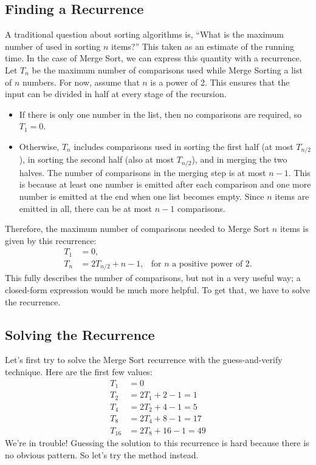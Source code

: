 \subsection{Finding a Recurrence}
A traditional question about sorting algorithms is, ``What is the
maximum number of  used in sorting $n$ items?''  This
taken as an estimate of the running time.  In the case of Merge Sort,
we can express this quantity with a recurrence.  Let $T_n$ be the
maximum number of comparisons used while Merge Sorting a list of $n$
numbers.  For now, assume that $n$ is a power of 2.  This ensures that
the input can be divided in half at every stage of the recursion.
\begin{itemize}
\item If there is only one number in the list, then no comparisons are
  required, so $T_1 = 0$.
\item Otherwise, $T_n$ includes comparisons used in sorting the first
  half (at most $T_{n/2}$), in sorting the second half (also at most
  $T_{n/2}$), and in merging the two halves.  The number of
  comparisons in the merging step is at most $n - 1$.  This is because
  at least one number is emitted after each comparison and one more
  number is emitted at the end when one list becomes empty.  Since $n$
  items are emitted in all, there can be at most $n - 1$ comparisons.
\end{itemize}
Therefore, the maximum number of comparisons needed to Merge Sort $n$
items is given by this recurrence:
\begin{align*}
T_1 & = 0, \\
T_{n} & = 2 T_{n/2} + n - 1, & \text{for $n$ a positive power of 2}.
\end{align*}
This fully describes the number of comparisons, but not in a very
useful way; a closed-form expression would be much more helpful.  To
get that, we have to solve the recurrence.

\subsection{Solving the Recurrence}

Let's first try to solve the Merge Sort recurrence with the
guess-and-verify technique.  Here are the first few values:
\begin{align*}
T_1 & = 0 \\
T_2 & = 2 T_1 + 2 - 1 = 1 \\
T_4 & = 2 T_2 + 4 - 1 = 5 \\
T_8 & = 2 T_4 + 8 - 1 = 17 \\
T_{16} & = 2 T_8 + 16 - 1 = 49
\end{align*}
We're in trouble!  Guessing the solution to this recurrence is hard
because there is no obvious pattern.  So let's try the 
method instead.

